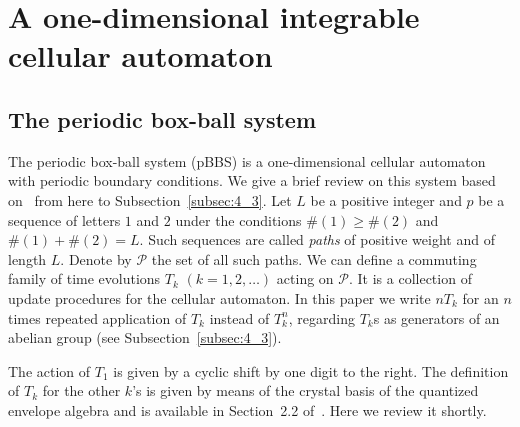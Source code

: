 \section{A one-dimensional integrable cellular automaton}\label{sec:4}
\subsection{The periodic box-ball system}\label{subsec:4_1}

The periodic box-ball system (pBBS) is a one-dimensional cellular automaton with periodic boundary conditions.
We give a brief review on this system based on~\cite{KTT} from here to Subsection~\ref{subsec:4_3}.
Let $L$ be a positive integer and $p$ be a sequence of letters $1$ and $2$ under the conditions
$\# (1) \geq \# (2)$ and $\# (1) + \# (2) = L$.
Such sequences are called {\em paths} of positive weight and of length $L$.
Denote by ${\mathcal P}$ the set of all such paths.
We can def\/ine a commuting family of time evolutions $T_k$ $(k=1,2,\ldots)$ acting on ${\mathcal P}$.
It is a collection of update procedures for the cellular automaton.
In this paper we write $n T_k$ for an $n$ times repeated application of $T_k$ instead of $T_k^n$,
regarding $T_k$s as generators of an abelian group (see Subsection~\ref{subsec:4_3}).

The action of $T_1$ is given by a cyclic shift by one digit to the right.
The def\/inition of $T_k$ for the other $k$'s is given by means of the crystal basis of
the quantized envelope algebra \cite{K}
and is available in Section~2.2 of~\cite{KTT}.
Here we review it shortly.

